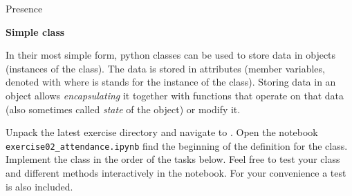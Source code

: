 \documentclass[a4paper, draft=False]{scrartcl}
\begin{document}



\begin{exam}[Presence]{Presence}
  \begin{instructions}

    \begin{problem*}\textbf{Simple class}

      In their most simple form, python classes can be used to store data in
      objects (instances of the class). The data is stored in attributes
      (member variables, denoted with  where  is
      stands for the instance of the class). Storing data in an object allows
      \emph{encapsulating} it together with functions that operate on that data
      (also sometimes called \emph{state} of the object) or modify it.

      Unpack the latest exercise directory and navigate to
      . Open the notebook
      \texttt{exercise02\_attendance.ipynb} find the beginning of the definition
      for the  class. Implement the class in the order of the tasks
      below. Feel free to test your class and different methods interactively in
      the notebook. For your convenience a test is also included.


\end{problem*}
\end{instructions}
\end{exam}
\end{document}
